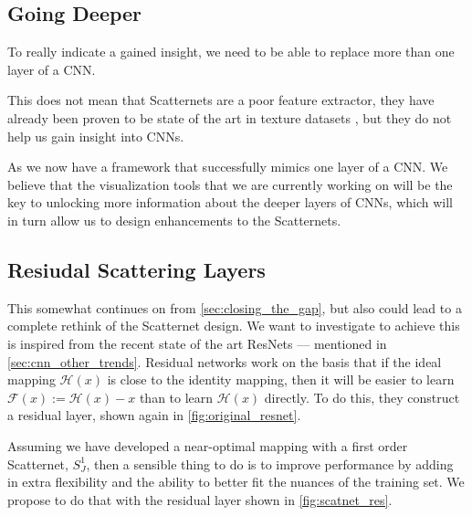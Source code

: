 \subsection{Going Deeper}\label{sec:going_deeper}
  To really indicate a gained
  insight, we need to be able to replace more than one layer of a CNN.
  
  This does not mean that Scatternets are a poor feature extractor, they have already
  been proven to be state of the art in texture datasets
  \citep{sifre_rotation_2013, sifre_rigid-motion_2014}, but they do not help us
  gain insight into CNNs. 

  As we now have a framework that successfully mimics one layer of
  a CNN\@. We believe that the
  visualization tools that we are currently working on  will be the key to
  unlocking more information about the deeper layers of CNNs, which will in
  turn allow us to design enhancements to the Scatternets.
  
\subsection{Resiudal Scattering Layers}\label{sec:residual_scat}
  This somewhat continues on from \autoref{sec:closing_the_gap}, but also could
  lead to a complete rethink of the Scatternet design.
  We want to investigate to achieve this is inspired from
  the recent state of the art ResNets --- mentioned in
  \autoref{sec:cnn_other_trends}. Residual networks work on the basis that if
  the ideal mapping $\mathcal{H}(x)$ is close to the identity mapping, then
  it will be easier to learn $\mathcal{F}(x) := \mathcal{H}(x)-x$ than to learn
  $\mathcal{H}(x)$ directly. To do this, they construct a residual layer, shown
  again in \autoref{fig:original_resnet}.
  
  Assuming we have developed a near-optimal mapping with a first order
  Scatternet, $S^1_{J}$, then a sensible thing to do is to improve performance by
  adding in extra flexibility and the ability to better fit the nuances of the
  training set. We propose to do that with the residual layer shown in
  \autoref{fig:scatnet_res}.

